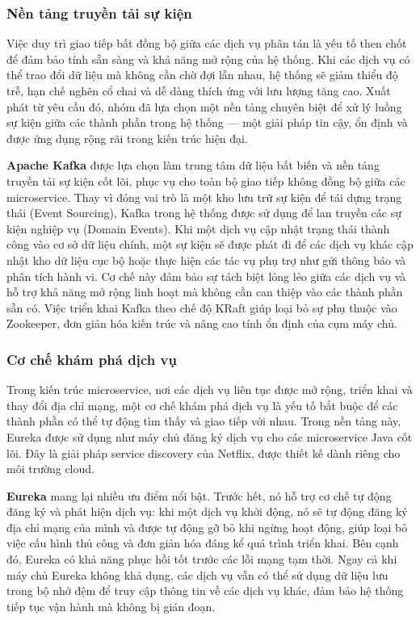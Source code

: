 \subsubsection{Nền tảng truyền tải sự kiện}

Việc duy trì giao tiếp bất đồng bộ giữa các dịch vụ phân tán là yếu tố then chốt để đảm bảo tính sẵn sàng và khả năng mở rộng của hệ thống. Khi các dịch vụ có thể trao đổi dữ liệu mà không cần chờ đợi lẫn nhau, hệ thống sẽ giảm thiểu độ trễ, hạn chế nghẽn cổ chai và dễ dàng thích ứng với lưu lượng tăng cao. Xuất phát từ yêu cầu đó, nhóm đã lựa chọn một nền tảng chuyên biệt để xử lý luồng sự kiện giữa các thành phần trong hệ thống — một giải pháp tin cậy, ổn định và được ứng dụng rộng rãi trong kiến trúc hiện đại.

\textbf{Apache Kafka} được lựa chọn làm trung tâm dữ liệu bất biến và nền tảng truyền tải sự kiện cốt lõi, phục vụ cho toàn bộ giao tiếp không đồng bộ giữa các microservice. Thay vì đóng vai trò là một kho lưu trữ sự kiện để tái dựng trạng thái (Event Sourcing), Kafka trong hệ thống được sử dụng để lan truyền các sự kiện nghiệp vụ (Domain Events). Khi một dịch vụ cập nhật trạng thái thành công vào cơ sở dữ liệu chính, một sự kiện sẽ được phát đi để các dịch vụ khác cập nhật kho dữ liệu cục bộ hoặc thực hiện các tác vụ phụ trợ như gửi thông báo và phân tích hành vi. Cơ chế này đảm bảo sự tách biệt lỏng lẻo giữa các dịch vụ và hỗ trợ khả năng mở rộng linh hoạt mà không cần can thiệp vào các thành phần sẵn có. Việc triển khai Kafka theo chế độ KRaft giúp loại bỏ sự phụ thuộc vào Zookeeper, đơn giản hóa kiến trúc và nâng cao tính ổn định của cụm máy chủ.

\subsubsection{Cơ chế khám phá dịch vụ}

Trong kiến trúc microservice, nơi các dịch vụ liên tục được mở rộng, triển khai và thay đổi địa chỉ mạng, một cơ chế khám phá dịch vụ là yếu tố bắt buộc để các thành phần có thể tự động tìm thấy và giao tiếp với nhau. Trong nền tảng này, Eureka được sử dụng như máy chủ đăng ký dịch vụ cho các microservice Java cốt lõi. Đây là giải pháp service discovery của Netflix, được thiết kế dành riêng cho môi trường cloud.

\textbf{Eureka} mang lại nhiều ưu điểm nổi bật. Trước hết, nó hỗ trợ cơ chế tự động đăng ký và phát hiện dịch vụ: khi một dịch vụ khởi động, nó sẽ tự động đăng ký địa chỉ mạng của mình và được tự động gỡ bỏ khi ngừng hoạt động, giúp loại bỏ việc cấu hình thủ công và đơn giản hóa đáng kể quá trình triển khai\cite{eureka_autoconfig}. Bên cạnh đó, Eureka có khả năng phục hồi tốt trước các lỗi mạng tạm thời. Ngay cả khi máy chủ Eureka không khả dụng, các dịch vụ vẫn có thể sử dụng dữ liệu lưu trong bộ nhớ đệm để truy cập thông tin về các dịch vụ khác, đảm bảo hệ thống tiếp tục vận hành mà không bị gián đoạn\cite{eureka_resilience}. 

